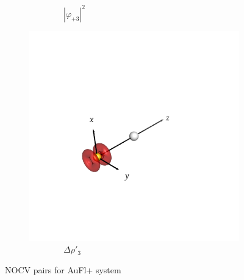 \documentclass[journal=inoraj,manuscript=article]{achemso}
\begin{document}
\begin{figure}[!h]
\begin{subfigure}[t]{0.32\textwidth}
        \caption*{\ \ \ \ \ \ \ \ $|\varphi_{+3}|^2$} 
    \end{subfigure}
    \hfill
    \begin{subfigure}[t]{0.32\textwidth}
        \centering
        \includegraphics[width=\linewidth]{./AuFl+/pair5.png} 
        \caption*{\ \ \ \ \ \ \ \ $\Delta \rho'_3$} 
    \end{subfigure}

\caption{NOCV pairs for AuFl+ system}
\end{figure}
\end{document}

